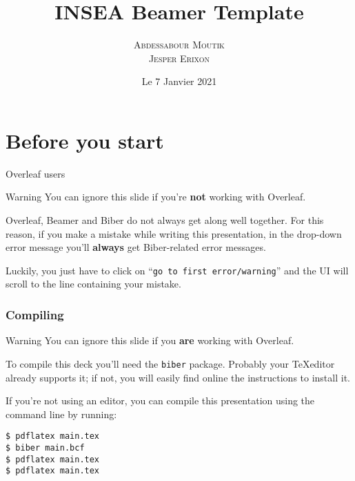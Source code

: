 \documentclass[usenames,dvipsnames,10pt,aspectratio=169]{beamer}
\title[]{\Huge INSEA Beamer Template}
\date[\today]{\small Le 7 Janvier 2021}
\author[shortname]{\scshape Abdessabour Moutik  \\ Jesper Erixon }
\institute[shortinst]{\textsuperscript{1} INSEA \\ \textsuperscript{2} EBOLA }
\begin{document}
\begin{frame}
\titlepage
\end{frame}

\begin{frame}{\contentsname}
\tableofcontents
\end{frame}

\section{Before you start}
\begin{frame}{Overleaf users}

\begin{alertblock}{Warning}
You can ignore this slide if you're \textbf{not} working with Overleaf.
\end{alertblock}

\vskip 0.5cm

Overleaf, Beamer and Biber do not always get along well together. For this reason, if you make a mistake while writing this presentation, in the drop-down error message you'll \textbf{always} get Biber-related error messages.

\vskip 0.5cm

Luckily, you just have to click on ``\texttt{go to first error/warning}'' and the UI will scroll to the line containing your mistake.

\end{frame}

\begin{frame}[fragile]
\frametitle{Compiling}

\begin{alertblock}{Warning}
You can ignore this slide if you \textbf{are} working with Overleaf.
\end{alertblock}

To compile this deck you'll need the \texttt{biber} package. Probably your \TeX editor already supports it; if not, you will easily find online the instructions to install it.

\vskip 0.5cm

If you're not using an editor, you can compile this presentation using the command line by running:

\begin{verbatim}
$ pdflatex main.tex
$ biber main.bcf
$ pdflatex main.tex
$ pdflatex main.tex
\end{verbatim}


\end{frame}
\end{document}
